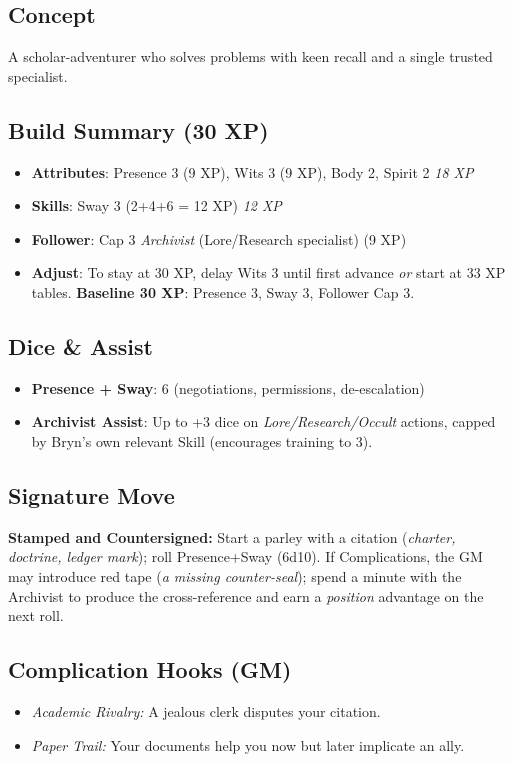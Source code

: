 \documentclass[12pt]{book}
\begin{document}
\subsection*{Concept}
A scholar-adventurer who solves problems with keen recall and a single trusted specialist.

\subsection*{Build Summary (30 XP)}
\begin{itemize}
  \item \textbf{Attributes}: Presence 3 (9 XP), Wits 3 (9 XP), Body 2, Spirit 2 \hfill \emph{18 XP}
  \item \textbf{Skills}: Sway 3 (2+4+6 = 12 XP) \hfill \emph{12 XP}
  \item \textbf{Follower}: Cap 3 \emph{Archivist} (Lore/Research specialist) (9 XP)
  \item \textbf{Adjust}: To stay at 30 XP, delay Wits 3 until first advance \emph{or} start at 33 XP tables. \textbf{Baseline 30 XP}: Presence 3, Sway 3, Follower Cap 3.
\end{itemize}

\subsection*{Dice \& Assist}
\begin{itemize}
  \item \textbf{Presence + Sway}: 6 (negotiations, permissions, de-escalation)
  \item \textbf{Archivist Assist}: Up to +3 dice on \emph{Lore/Research/Occult} actions, capped by Bryn’s own relevant Skill (encourages training to 3).
\end{itemize}

\subsection*{Signature Move}
\textbf{Stamped and Countersigned:} Start a parley with a citation (\emph{charter, doctrine, ledger mark}); roll Presence+Sway (6d10). If Complications, the GM may introduce red tape (\emph{a missing counter-seal}); spend a minute with the Archivist to produce the cross-reference and earn a \emph{position} advantage on the next roll.

\subsection*{Complication Hooks (GM)}
\begin{itemize}
  \item \emph{Academic Rivalry:} A jealous clerk disputes your citation.
  \item \emph{Paper Trail:} Your documents help you now but later implicate an ally.
\end{itemize}
\end{document}
